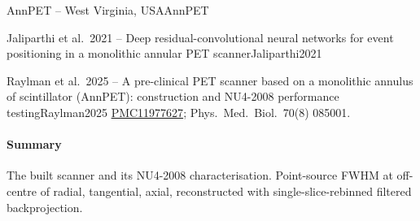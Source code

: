 \begin{programnote}{AnnPET -- West Virginia, USA}{AnnPET}
\begin{papernote}{Jaliparthi et al.\ 2021 -- Deep residual-convolutional neural networks for event positioning in a monolithic annular PET scanner}{Jaliparthi2021}
\end{papernote}

\begin{papernote}{Raylman et al.\ 2025 -- A pre-clinical PET scanner based on a monolithic annulus of scintillator (AnnPET): construction and NU4-2008 performance testing}{Raylman2025}
\href{https://pmc.ncbi.nlm.nih.gov/articles/PMC11977627/}{PMC11977627}; Phys.\ Med.\ Biol.\ 70(8) 085001.

\paragraph{Summary}
The built scanner and its NU4-2008 characterisation. Point-source FWHM at
 off-centre of  radial,  tangential, 
axial, reconstructed with single-slice-rebinned filtered backprojection.

\end{papernote}
 
\end{programnote}
 
 
 
